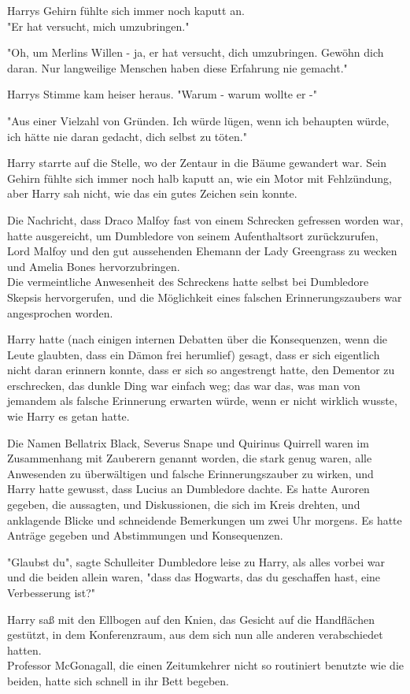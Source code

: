 {Harrys Gehirn fühlte sich immer noch kaputt an.\\ "Er hat versucht, mich umzubringen."

"Oh, um Merlins Willen - ja, er hat versucht, dich umzubringen. Gewöhn dich daran. Nur langweilige Menschen haben diese Erfahrung nie gemacht."

Harrys Stimme kam heiser heraus. "Warum - warum wollte er -"

"Aus einer Vielzahl von Gründen. Ich würde lügen, wenn ich behaupten würde, ich hätte nie daran gedacht, dich selbst zu töten."

Harry starrte auf die Stelle, wo der Zentaur in die Bäume gewandert war. Sein Gehirn fühlte sich immer noch halb kaputt an, wie ein Motor mit Fehlzündung, aber Harry sah nicht, wie das ein gutes Zeichen sein konnte.

Die Nachricht, dass Draco Malfoy fast von einem Schrecken gefressen worden war, hatte ausgereicht, um Dumbledore von seinem Aufenthaltsort zurückzurufen, Lord Malfoy und den gut aussehenden Ehemann der Lady Greengrass zu wecken und Amelia Bones hervorzubringen.\\ Die vermeintliche Anwesenheit des Schreckens hatte selbst bei Dumbledore Skepsis hervorgerufen, und die Möglichkeit eines falschen Erinnerungszaubers war angesprochen worden.

Harry hatte (nach einigen internen Debatten über die Konsequenzen, wenn die Leute glaubten, dass ein Dämon frei herumlief) gesagt, dass er sich eigentlich nicht daran erinnern konnte, dass er sich so angestrengt hatte, den Dementor zu erschrecken, das dunkle Ding war einfach weg; das war das, was man von jemandem als falsche Erinnerung erwarten würde, wenn er nicht wirklich wusste, wie Harry es getan hatte.

Die Namen Bellatrix Black, Severus Snape und Quirinus Quirrell waren im Zusammenhang mit Zauberern genannt worden, die stark genug waren, alle Anwesenden zu überwältigen und falsche Erinnerungszauber zu wirken, und Harry hatte gewusst, dass Lucius an Dumbledore dachte. Es hatte Auroren gegeben, die aussagten, und Diskussionen, die sich im Kreis drehten, und anklagende Blicke und schneidende Bemerkungen um zwei Uhr morgens. Es hatte Anträge gegeben und Abstimmungen und Konsequenzen.

"Glaubst du", sagte Schulleiter Dumbledore leise zu Harry, als alles vorbei war und die beiden allein waren, "dass das Hogwarts, das du geschaffen hast, eine Verbesserung ist?"

Harry saß mit den Ellbogen auf den Knien, das Gesicht auf die Handflächen gestützt, in dem Konferenzraum, aus dem sich nun alle anderen verabschiedet hatten.\\ Professor McGonagall, die einen Zeitumkehrer nicht so routiniert benutzte wie die beiden, hatte sich schnell in ihr Bett begeben.

}
